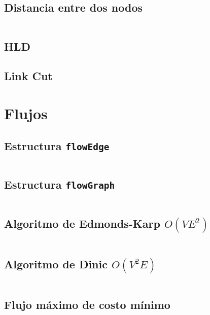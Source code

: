 \documentclass[11pt]{article}
\begin{document}
		\subsection{Distancia entre dos nodos}
		\inputminted[tabsize=2,breaklines,firstline=507,lastline=530,fontsize=\small]{c++}{graph.cpp}
		
		\subsection{HLD}
		
		
		\subsection{Link Cut}
		
		
	\newpage
	\section{Flujos}
		\subsection{Estructura \texttt{flowEdge}}
		\inputminted[tabsize=2,breaklines,firstline=4,lastline=17,fontsize=\small]{c++}{flow.cpp}
		
		\subsection{Estructura \texttt{flowGraph}}
		\inputminted[tabsize=2,breaklines,firstline=19,lastline=38,fontsize=\small]{c++}{flow.cpp}
		
		\subsection{Algoritmo de Edmonds-Karp $O(VE^2)$}
		\inputminted[tabsize=2,breaklines,firstline=82,lastline=108,fontsize=\small]{c++}{flow.cpp}
		
		\subsection{Algoritmo de Dinic $O(V^2E)$}
		\inputminted[tabsize=2,breaklines,firstline=40,lastline=80,fontsize=\small]{c++}{flow.cpp}
		
		\subsection{Flujo máximo de costo mínimo}
		\inputminted[tabsize=2,breaklines,firstline=110,lastline=145,fontsize=\small]{c++}{flow.cpp}
		
\end{document}
